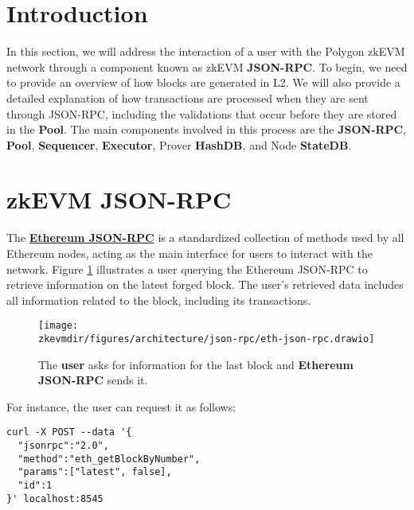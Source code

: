 


\section{Introduction}

In this section, we will address the interaction of a user with the Polygon zkEVM network through a component known as zkEVM \textbf{JSON-RPC}. To begin, we need to provide an overview of how blocks are generated in L2. We will also provide a detailed explanation of how transactions are processed when they are sent through JSON-RPC, including the validations that occur before they are stored in the \textbf{Pool}. The main components involved in this process are the \textbf{JSON-RPC}, \textbf{Pool}, \textbf{Sequencer}, \textbf{Executor}, Prover \textbf{HashDB}, and Node \textbf{StateDB}.




\section{zkEVM JSON-RPC}

The \href{https://ethereum.org/en/developers/docs/apis/json-rpc}{\textbf{Ethereum JSON-RPC}} is a standardized collection of methods used by all Ethereum nodes, acting as the main interface for users to interact with the network. Figure \ref{fig:eth-json-rpc} illustrates a user querying the Ethereum JSON-RPC to retrieve information on the latest forged block. The user's retrieved data includes all information related to the block, including its transactions.

\begin{figure}[H]
\centering
\texttt{[image: \\zkevmdir/figures/architecture/json-rpc/eth-json-rpc.drawio]}
\caption{The \textbf{user} asks for information  for the last block and \textbf{Ethereum JSON-RPC} sends it.}
\label{fig:eth-json-rpc}
\end{figure}

For instance, the user can request it as follows:

\begin{lstlisting}[style=termt]
curl -X POST --data '{
  "jsonrpc":"2.0",
  "method":"eth_getBlockByNumber",
  "params":["latest", false],
  "id":1
}' localhost:8545
\end{lstlisting}

